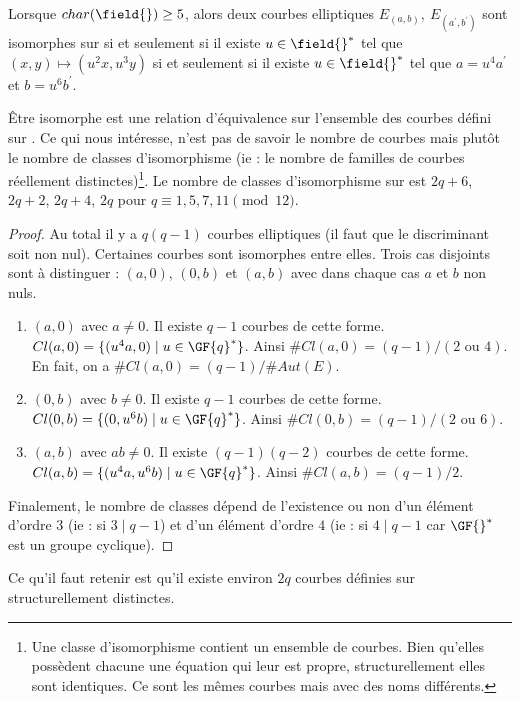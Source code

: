 \vspace{0.2cm}

\begin{propriete}
Lorsque $char(\field{}) \geq 5$, alors deux courbes elliptiques $E_{(a, b)},\ E_{(a^{'}, b^{'})}$ sont isomorphes sur \field{} si et seulement si il existe $u \in \field{}^{*}$ tel que $(x, y) \mapsto (u^2x, u^3y)$ si et seulement si il existe $u \in \field{}^{*}$ tel que $a = u^4 a^{'}$ et $b = u^6 b^{'}$.
\end{propriete}

\begin{theoreme}
\^Etre isomorphe est une relation d'équivalence sur l'ensemble des courbes défini sur . Ce qui nous intéresse, n'est pas de savoir le nombre de courbes mais plutôt le nombre de classes d'isomorphisme (ie : le nombre de familles de courbes réellement distinctes)\footnote{Une classe d'isomorphisme contient un ensemble de courbes. Bien qu'elles possèdent chacune une équation qui leur est propre, structurellement elles sont identiques. Ce sont les mêmes courbes mais avec des noms différents.}. Le nombre de classes d'isomorphisme sur  est $2q + 6$, $2q + 2$, $2q + 4$, $2q$ pour $ q \equiv 1, 5, 7, 11 \pmod{12}$.\begin{proof}
Au total il y a $q(q-1)$ courbes elliptiques (il faut que le discriminant soit non nul). Certaines courbes sont isomorphes entre elles. Trois cas disjoints sont à distinguer : $(a, 0)$, $(0, b)$ et $(a, b)$ avec dans chaque cas $a$ et $b$ non nuls. 
\begin{enumerate}
    \item $(a, 0)$ avec $a \neq 0$. Il existe $q-1$ courbes de cette forme. $Cl(a, 0) = \{ (u^4a, 0) \mid u \in \GF{q}^* \}$. Ainsi $\# Cl(a, 0) = (q-1)/(2 \text{ ou } 4)$. En fait, on a $\# Cl(a, 0) = (q-1)/ \# Aut(E)$.
    \item $(0, b)$ avec $b \neq 0$. Il existe $q-1$ courbes de cette forme. $Cl(0, b) = \{ (0, u^6 b) \mid u \in \GF{q}^* \}$. Ainsi $\# Cl(0, b) = (q-1)/(2 \text{ ou } 6)$.
    \item $(a, b)$ avec $ab \neq 0$. Il existe $(q-1)(q-2)$ courbes de cette forme. $Cl(a, b) = \{ (u^4a, u^6b) \mid u \in \GF{q}^* \}$. Ainsi $\# Cl(a, b) = (q-1)/2$.
\end{enumerate}
Finalement, le nombre de classes dépend de l'existence ou non d'un élément d'ordre $3$ (ie : si $3 \mid q-1$) et d'un élément d'ordre $4$ (ie : si $4 \mid q-1$ car $\GF{}^*$ est un groupe cyclique).
\end{proof}
Ce qu'il faut retenir est qu'il existe environ $2q$ courbes définies sur  structurellement distinctes.
\end{theoreme}


